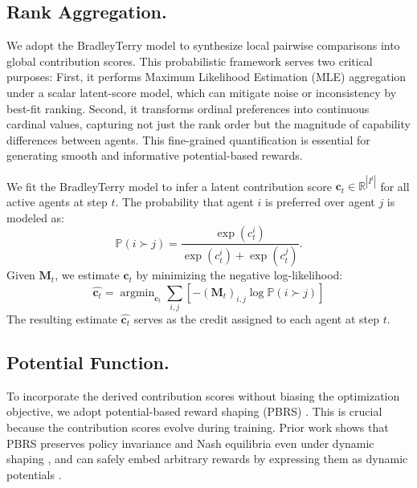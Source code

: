 \documentclass[11pt]{article}
\begin{document}
%
%
%
%
%



\subsection{Rank Aggregation.} 
We adopt the Bradley\textendash Terry model \cite{bradley1952rank} to synthesize local pairwise comparisons into global contribution scores. This probabilistic framework serves two critical purposes: First, it performs Maximum Likelihood Estimation (MLE) \cite{bishop2006pattern} aggregation under a scalar latent-score model, which can mitigate noise or inconsistency by best-fit ranking. Second, it transforms ordinal preferences into continuous cardinal values, capturing not just the rank order but the magnitude of capability differences between agents. This fine-grained quantification is essential for generating smooth and informative potential-based rewards. 

We fit the Bradley\textendash Terry model to infer a latent contribution score 
\(
\boldsymbol{c}_t \in \mathbb{R}^{|I^t|}
\)
for all active agents at step \(t\). The probability that agent \(i\) is preferred over agent \(j\) is modeled as:
\begin{equation}
\mathbb{P}(i \succ j)
= \frac{\exp(c_t^{i})}{\exp(c_t^{i}) + \exp(c_t^{j})}.
\end{equation} 
Given $\boldsymbol{M}_t$, we estimate \(\boldsymbol{c}_t\) by minimizing the negative log-likelihood:
\begin{equation}
    \hat{\boldsymbol{c}_t} = \mathop{\arg\min}_{\boldsymbol{c}_t} \sum_{i, j} \left[- (\boldsymbol{M}_t)_{i,j} \log \mathbb{P}(i \succ j)\right]
\end{equation}
The resulting estimate $\hat{\boldsymbol{c}_t}$ serves as the credit assigned to each agent at step $t$.

\subsection{Potential Function.} 
To incorporate the derived contribution scores without biasing the optimization objective, we adopt potential-based reward shaping (PBRS) \cite{ng1999policy}. This is crucial because the contribution scores evolve during training. Prior work shows that PBRS preserves policy invariance and Nash equilibria even under dynamic shaping \cite{devlin2012dynamic}, and can safely embed arbitrary rewards by expressing them as dynamic potentials \cite{harutyunyan2015expressing}.
%
\end{document}
